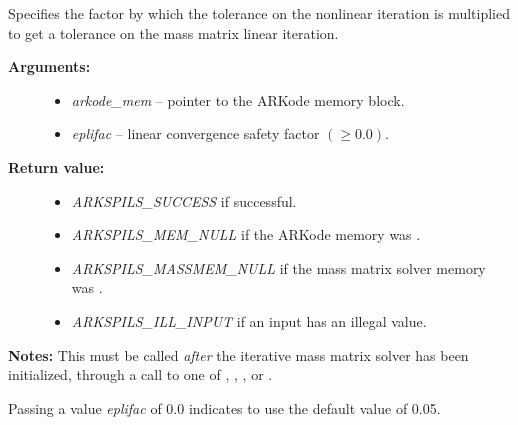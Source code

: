 \documentclass[letterpaper,10pt,english]{sphinxmanual}
\begin{document}

\begin{fulllineitems}
\label{c_interface/User_callable:ARKSpilsSetMassEpsLin}
Specifies the factor by which the tolerance on the nonlinear
iteration is multiplied to get a tolerance on the mass matrix
linear iteration.
\begin{description}
\item[{\textbf{Arguments:}}] \leavevmode\begin{itemize}
\item {} 
\emph{arkode\_mem} -- pointer to the ARKode memory block.

\item {} 
\emph{eplifac} -- linear convergence safety factor $(\ge 0.0)$.

\end{itemize}

\item[{\textbf{Return value:}}] \leavevmode\begin{itemize}
\item {} 
\emph{ARKSPILS\_SUCCESS} if successful.

\item {} 
\emph{ARKSPILS\_MEM\_NULL} if the ARKode memory was .

\item {} 
\emph{ARKSPILS\_MASSMEM\_NULL} if the mass matrix solver memory was .

\item {} 
\emph{ARKSPILS\_ILL\_INPUT} if an input has an illegal value.

\end{itemize}

\end{description}

\textbf{Notes:} This must be called \emph{after} the iterative mass matrix
solver has been initialized, through a call to one of
{\hyperref[c_interface/User_callable:ARKMassSpgmr]{}}, {\hyperref[c_interface/User_callable:ARKMassSpbcg]{}},
{\hyperref[c_interface/User_callable:ARKMassSptfqmr]{}}, {\hyperref[c_interface/User_callable:ARKMassSpfgmr]{}} or
{\hyperref[c_interface/User_callable:ARKMassPcg]{}}.

Passing a value \emph{eplifac} of 0.0 indicates to use the default value
of 0.05.

\end{fulllineitems}
\end{document}
